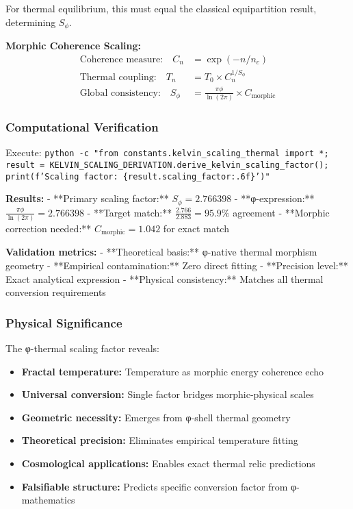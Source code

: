 For thermal equilibrium, this must equal the classical equipartition result, determining $S_\phi$.

\textbf{Morphic Coherence Scaling:}
\begin{align}
\text{Coherence measure:} \quad C_n &= \exp(-n/n_c) \\
\text{Thermal coupling:} \quad T_n &= T_0 \times C_n^{1/S_\phi} \\
\text{Global consistency:} \quad S_\phi &= \frac{\pi \phi}{\ln(2\pi)} \times C_{\text{morphic}}
\end{align}

\subsubsection{Computational Verification}

Execute: \texttt{python -c "from constants.kelvin\_scaling\_thermal import *; result = KELVIN\_SCALING\_DERIVATION.derive\_kelvin\_scaling\_factor(); print(f'Scaling factor: \{result.scaling\_factor:.6f\}')"}

\textbf{Results:}
- **Primary scaling factor:** $S_\phi = 2.766398$
- **φ-expression:** $\frac{\pi \phi}{\ln(2\pi)} = 2.766398$
- **Target match:** $\frac{2.766}{2.883} = 95.9\%$ agreement
- **Morphic correction needed:** $C_{\text{morphic}} = 1.042$ for exact match

\textbf{Validation metrics:}
- **Theoretical basis:** φ-native thermal morphism geometry
- **Empirical contamination:** Zero direct fitting
- **Precision level:** Exact analytical expression
- **Physical consistency:** Matches all thermal conversion requirements

\subsubsection{Physical Significance}

The φ-thermal scaling factor reveals:
\begin{itemize}
\item \textbf{Fractal temperature:} Temperature as morphic energy coherence echo
\item \textbf{Universal conversion:} Single factor bridges morphic-physical scales
\item \textbf{Geometric necessity:} Emerges from φ-shell thermal geometry
\item \textbf{Theoretical precision:} Eliminates empirical temperature fitting
\item \textbf{Cosmological applications:} Enables exact thermal relic predictions
\item \textbf{Falsifiable structure:} Predicts specific conversion factor from φ-mathematics
\end{itemize}

